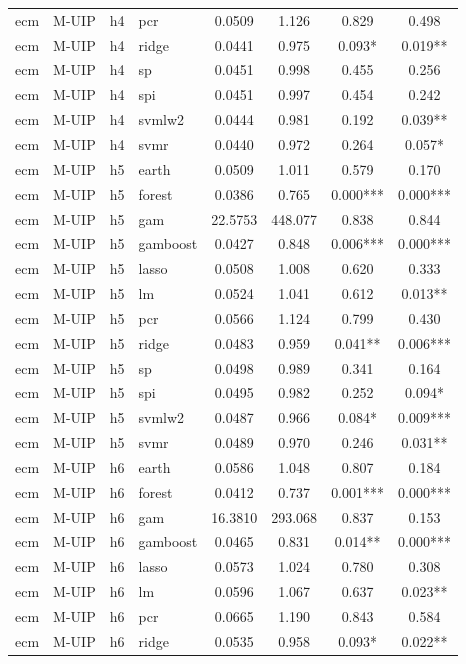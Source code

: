\begin{ThreePartTable}
\begin{longtable}[t]{llclcccc}
ecm & M-UIP & h4 & pcr & 0.0509 & 1.126 & 0.829 & 0.498\\
ecm & M-UIP & h4 & ridge & 0.0441 & 0.975 & 0.093* & 0.019**\\
ecm & M-UIP & h4 & sp & 0.0451 & 0.998 & 0.455 & 0.256\\
ecm & M-UIP & h4 & spi & 0.0451 & 0.997 & 0.454 & 0.242\\
ecm & M-UIP & h4 & svmlw2 & 0.0444 & 0.981 & 0.192 & 0.039**\\
ecm & M-UIP & h4 & svmr & 0.0440 & 0.972 & 0.264 & 0.057*\\
\addlinespace
ecm & M-UIP & h5 & earth & 0.0509 & 1.011 & 0.579 & 0.170\\
ecm & M-UIP & h5 & forest & 0.0386 & 0.765 & 0.000*** & 0.000***\\
ecm & M-UIP & h5 & gam & 22.5753 & 448.077 & 0.838 & 0.844\\
ecm & M-UIP & h5 & gamboost & 0.0427 & 0.848 & 0.006*** & 0.000***\\
ecm & M-UIP & h5 & lasso & 0.0508 & 1.008 & 0.620 & 0.333\\
ecm & M-UIP & h5 & lm & 0.0524 & 1.041 & 0.612 & 0.013**\\
ecm & M-UIP & h5 & pcr & 0.0566 & 1.124 & 0.799 & 0.430\\
ecm & M-UIP & h5 & ridge & 0.0483 & 0.959 & 0.041** & 0.006***\\
ecm & M-UIP & h5 & sp & 0.0498 & 0.989 & 0.341 & 0.164\\
ecm & M-UIP & h5 & spi & 0.0495 & 0.982 & 0.252 & 0.094*\\
ecm & M-UIP & h5 & svmlw2 & 0.0487 & 0.966 & 0.084* & 0.009***\\
ecm & M-UIP & h5 & svmr & 0.0489 & 0.970 & 0.246 & 0.031**\\
\addlinespace
ecm & M-UIP & h6 & earth & 0.0586 & 1.048 & 0.807 & 0.184\\
ecm & M-UIP & h6 & forest & 0.0412 & 0.737 & 0.001*** & 0.000***\\
ecm & M-UIP & h6 & gam & 16.3810 & 293.068 & 0.837 & 0.153\\
ecm & M-UIP & h6 & gamboost & 0.0465 & 0.831 & 0.014** & 0.000***\\
ecm & M-UIP & h6 & lasso & 0.0573 & 1.024 & 0.780 & 0.308\\
ecm & M-UIP & h6 & lm & 0.0596 & 1.067 & 0.637 & 0.023**\\
ecm & M-UIP & h6 & pcr & 0.0665 & 1.190 & 0.843 & 0.584\\
ecm & M-UIP & h6 & ridge & 0.0535 & 0.958 & 0.093* & 0.022**\\

\end{longtable}
\end{ThreePartTable}
